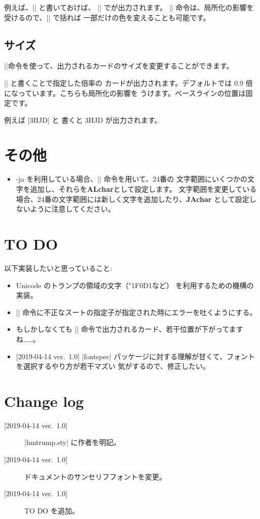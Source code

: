 \documentclass{jlreq}
\begin{document}
例えば、|| と書いておけば、
|\hmH| で{\hmH}が出力されます。
|\definecolor| 命令は、局所化の影響を受けるので、|{}| で括れば
一部だけの色を変えることも可能です。

\subsection{サイズ}
|\tizset|命令を使って、出力されるカードのサイズを変更することができます。

|| と書くことで指定した倍率の
カードが出力されます。デフォルトでは 0.9 倍になっています。こちらも局所化の影響を
うけます。ベースラインの位置は固定です。

例えば |{\trump 3H}\trump JD| と
書くと {\trump 3H}\trump JD が出力されます。

\section{その他}
\begin{itemize}
\item \LuaLaTeX-ja を利用している場合、|\ltjdefcharrange| 命令を用いて、24番の
	文字範囲にいくつかの文字を追加し、それらを\textbf{ALchar}として設定します。
	文字範囲を変更している場合、24番の文字範囲には新しく文字を追加したり、\textbf{JAchar}
	として設定しないように注意してください。
\end{itemize}
	

\section{TO DO}
以下実装したいと思っていること:
\begin{itemize}
\item Unicode のトランプの領域の文字（{\char"1F0D1}など）
	を利用するための機構の実装。
\item |\trump| 命令に不正なスートの指定子が指定された時にエラーを吐くようにする。
\item もしかしなくても |\joker| 命令で出力されるカード、若干位置が下がってますね……。
\item {[2019-04-14 ver.~1.0]} |fontspec| パッケージに対する理解が甘くて、フォントを選択するやり方が若干マズい
	気がするので、修正したい。
\end{itemize}


\section{Change log}
\begin{description}
\item[{[2019-04-14 ver.~1.0]}] |hmtrump.sty| に作者を明記。
\item[{[2019-04-14 ver.~1.0]}] ドキュメントのサンセリフフォントを変更。
\item[{[2019-04-14 ver.~1.0]}] TO DO を追加。
\end{description}
\end{document}
